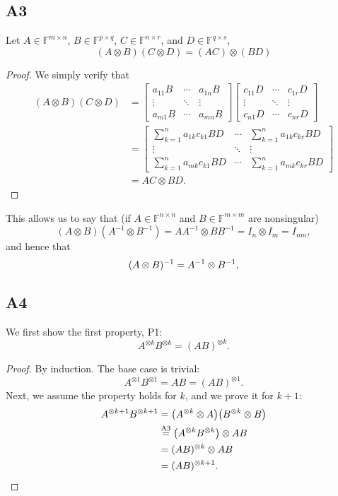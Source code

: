 \documentclass[11pt]{article}
\newcommand{\field}{\mathbb{F}} %
\newcommand{\kp}{\otimes} %
\begin{document}
\subsection*{A3}
Let \(A \in \field^{m \times n}\), \(B \in \field^{p \times q}\), \(C \in \field^{n \times r}\), and \(D \in \field^{q \times s}\),
\begin{equation*}
(A \kp B) (C \kp D)=(AC)\kp (BD)
\end{equation*}
\begin{proof}
We simply verify that
\begin{align*}
(A \kp B) (C \kp D) &= \begin{bmatrix}
a_{11} B & \cdots & a_{1n}B \\
\vdots & \ddots & \vdots \\
a_{m1} B & \cdots & a_{mn} B
\end{bmatrix} \begin{bmatrix}
c_{11} D & \cdots & c_{1r} D \\
\vdots & \ddots & \vdots \\
c_{n1} D & \cdots & c_{nr} D
\end{bmatrix}\\
&= \begin{bmatrix}
\sum_{k=1}^n a_{1k} c_{k1} BD & \cdots & \sum_{k=1}^n a_{1k} c_{kr} BD \\
\vdots & \ddots & \vdots \\
\sum_{k=1}^n a_{mk} c_{k1} BD & \cdots & \sum_{k=1}^n a_{mk} c_{kr} BD
\end{bmatrix}\\
&= AC \kp BD.
\end{align*}
\end{proof}

This allows us to say that (if \(A \in \field^{n \times n}\) and \(B \in \field^{m \times m}\) are nonsingular)
\[
(A \kp B)(A^{-1} \kp B^{-1}) = AA^{-1} \kp BB^{-1} = I_n \kp I_m = I_{nm},
\]
and hence that
\[
(A \kp B)^{-1} = A^{-1} \kp B^{-1}.\qedhere
\]

\subsection*{A4}
We first show the first property, P1:
\[
A^{\kp k} B^{\kp k} = (AB)^{\kp k}.
\]
\begin{proof}
By induction.
The base case is trivial:
\[
A^{\kp 1} B^{\kp 1} = AB = (AB)^{\kp 1}.
\]
Next, we assume the property holds for $k$, and we prove it for $k+1$:
\begin{align*}
A^{\kp k+1} B^{\kp k+1} &= \big(A^{\kp k} \kp A\big) \big(B^{\kp k} \kp B\big)\\
&\overset{\textnormal{A3}}{=}\big(A^{\kp k} B^{\kp k}\big) \kp AB\\
&= (AB)^{\kp k} \kp AB\\
&= (AB)^{\kp k+1}.\qedhere
\end{align*}
\end{proof}
\end{document}
